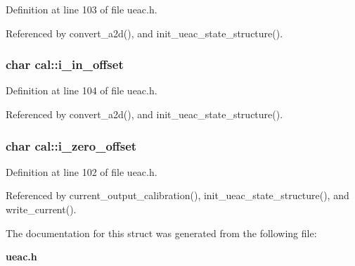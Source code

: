 Definition at line 103 of file ueac.h.

Referenced by convert\_\-a2d(), and init\_\-ueac\_\-state\_\-structure().
\subsubsection{\setlength{\rightskip}{0pt plus 5cm}char {\bf cal::i\_\-in\_\-offset}}\label{structcal_o3}




Definition at line 104 of file ueac.h.

Referenced by convert\_\-a2d(), and init\_\-ueac\_\-state\_\-structure().
\subsubsection{\setlength{\rightskip}{0pt plus 5cm}char {\bf cal::i\_\-zero\_\-offset}}\label{structcal_o1}




Definition at line 102 of file ueac.h.

Referenced by current\_\-output\_\-calibration(), init\_\-ueac\_\-state\_\-structure(), and write\_\-current().

The documentation for this struct was generated from the following file:\begin{CompactItemize}
\item 
{\bf ueac.h}\end{CompactItemize}
